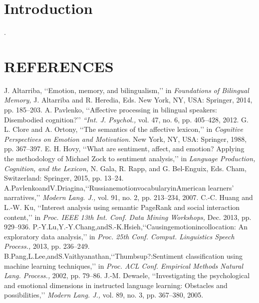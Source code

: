 \documentclass[a4paper,12pt,oneside]{article}
\begin{document}
\newpage
\section{Introduction}








\newpage
.
\newpage

\section{REFERENCES}
\begin{thebibliography}{9}


 J. Altarriba, ‘‘Emotion, memory, and bilingualism,’’ in \emph{Foundations of Bilingual Memory, }J. Altarriba and R. Heredia, Eds. New York, NY, USA: Springer, 2014, pp. 185–203.
 A. Pavlenko, ‘‘Affective processing in bilingual speakers: Disembodied cognition?’’ \emph{ “Int. J. Psychol., }vol. 47, no. 6, pp. 405–428, 2012.
 G. L. Clore and A. Ortony, ‘‘The semantics of the affective lexicon,’’ in \emph{Cognitive Perspectives on Emotion and Motivation. }New York, NY, USA: Springer, 1988, pp. 367–397.
 E. H. Hovy, ‘‘What are sentiment, affect, and emotion? Applying the methodology of Michael Zock to sentiment analysis,’’ in \emph{Language Production, Cognition, and the Lexicon, }N. Gala, R. Rapp, and G. Bel-Enguix, Eds. Cham, Switzerland: Springer, 2015, pp. 13–24.
 A.PavlenkoandV.Driagina,‘‘RussianemotionvocabularyinAmerican learners’ narratives,’’ \emph{Modern Lang. J., }vol. 91, no. 2, pp. 213–234, 2007.
 C.-C. Huang and L.-W. Ku, ‘‘Interest analysis using semantic PageRank and social interaction content,’’ in \emph{Proc. IEEE 13th Int. Conf. Data Mining Workshops, }Dec. 2013, pp. 929–936.
 P.-Y.Lu,Y.-Y.Chang,andS.-K.Hsieh,‘‘Causingemotionincollocation: An exploratory data analysis,’’ in \emph{Proc. 25th Conf. Comput. Linguistics Speech Process.,} 2013, pp. 236–249.
 B.Pang,L.Lee,andS.Vaithyanathan,‘‘Thumbsup?:Sentiment classification using machine learning techniques,’’ in \emph{Proc. ACL Conf. Empirical Methods Natural Lang. Process.,} 2002, pp. 79–86.
 J.-M. Dewaele, ‘‘Investigating the psychological and emotional dimensions in instructed language learning: Obstacles and possibilities,’’ \emph{Modern Lang. J.,} vol. 89, no. 3, pp. 367–380, 2005.

\end{thebibliography}
\end{document}
